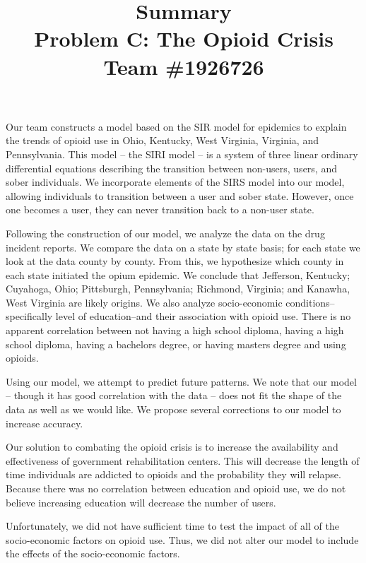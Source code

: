 \documentclass[12pt, letterpaper]{article}
\title{
	\huge{\bf{Summary}}\\
	\huge{Problem C: The Opioid Crisis}\\
	\bigskip
	\large{Team \#1926726}\\
	\date{}
}
\begin{document}
\maketitle

Our team constructs a model based on the SIR model for epidemics to explain the trends of opioid use in Ohio, Kentucky, West Virginia, Virginia, and Pennsylvania. This model -- the SIRI model -- is a system of three linear ordinary differential equations describing the transition between non-users, users, and sober individuals. We incorporate elements of the SIRS model into our model, allowing individuals to transition between a user and sober state. However, once one becomes a user, they can never transition back to a non-user state. 

Following the construction of our model, we analyze the data on the drug incident reports. We compare the data on a state by state basis; for each state we look at the data county by county. From this, we hypothesize which county in each state initiated the opium epidemic. We conclude that Jefferson, Kentucky; Cuyahoga, Ohio; Pittsburgh, Pennsylvania; Richmond, Virginia; and Kanawha, West Virginia are likely origins. 
We also analyze socio-economic conditions--specifically level of education--and their association with opioid use. There is no apparent correlation between not having a high school diploma, having a high school diploma, having a bachelors degree, or having masters degree and using opioids.  

Using our model, we attempt to predict future patterns. We note that our model -- though it has good correlation with the data -- does not fit the shape of the data as well as we would like. We propose several corrections to our model to increase accuracy. 

Our solution to combating the opioid crisis is to increase the availability and effectiveness of government rehabilitation centers. This will decrease the length of time individuals are addicted to opioids and the probability they will relapse. Because there was no correlation between education and opioid use, we do not believe increasing education will decrease the number of users. 

Unfortunately, we did not have sufficient time to test the impact of all of the socio-economic factors on opioid use. Thus, we did not alter our model to include the effects of the socio-economic factors.
 
\end{document}
